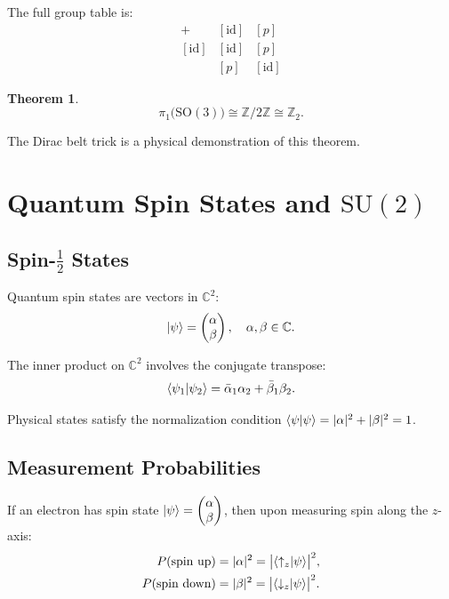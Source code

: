 \documentclass[11pt,a4paper]{article}
\theoremstyle{definition}
\theoremstyle{plain}
\newtheorem{theorem}{Theorem}[section]
\theoremstyle{remark}
\begin{document}
The full group table is:
\[
\begin{array}{c|cc}
    + & [\mathrm{id}] & [p] \\ \hline
    [\mathrm{id}] & [\mathrm{id}] & [p] \\
    [p] & [p] & [\mathrm{id}]
\end{array}
\]

\begin{theorem}
    \[
        \pi_1\bigl(\mathrm{SO}(3)\bigr) \cong \mathbb{Z}/2\mathbb{Z} \cong \mathbb{Z}_2.
    \]
\end{theorem}

The Dirac belt trick is a physical demonstration of this theorem.

\section{Quantum Spin States and $\mathrm{SU}(2)$}

\subsection{Spin-$\frac{1}{2}$ States}

Quantum spin states are vectors in $\mathbb{C}^2$:
\[
    \ket{\psi} = \begin{pmatrix} \alpha \\ \beta \end{pmatrix}, \quad \alpha, \beta \in \mathbb{C}.
\]

The inner product on $\mathbb{C}^2$ involves the conjugate transpose:
\[
    \braket{\psi_1}{\psi_2} = \bar{\alpha}_1 \alpha_2 + \bar{\beta}_1 \beta_2.
\]

Physical states satisfy the normalization condition $\braket{\psi}{\psi} = |\alpha|^2 + |\beta|^2 = 1$.

\subsection{Measurement Probabilities}

If an electron has spin state $\ket{\psi} = \begin{pmatrix} \alpha \\ \beta \end{pmatrix}$, then upon measuring spin along the $z$-axis:
\begin{align}
    P(\text{spin up}) &= |\alpha|^2 = \bigl|\braket{\uparrow_z}{\psi}\bigr|^2, \\
    P(\text{spin down}) &= |\beta|^2 = \bigl|\braket{\downarrow_z}{\psi}\bigr|^2.
\end{align}
\end{document}
